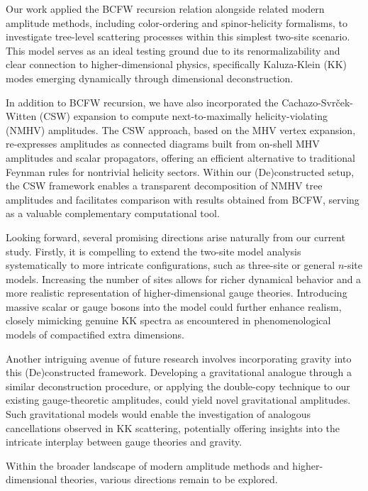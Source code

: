 \documentclass[12pt]{article}
\numberwithin{equation}{section}
\begin{document}
Our work applied the BCFW recursion relation alongside related modern amplitude methods, including color-ordering and spinor-helicity formalisms, to investigate tree-level scattering processes within this simplest two-site scenario. This model serves as an ideal testing ground due to its renormalizability and clear connection to higher-dimensional physics, specifically Kaluza-Klein (KK) modes emerging dynamically through dimensional deconstruction.

In addition to BCFW recursion, we have also incorporated the Cachazo-Svrček-Witten (CSW) expansion to compute next-to-maximally helicity-violating (NMHV) amplitudes. The CSW approach, based on the MHV vertex expansion, re-expresses amplitudes as connected diagrams built from on-shell MHV amplitudes and scalar propagators, offering an efficient alternative to traditional Feynman rules for nontrivial helicity sectors. Within our (De)constructed setup, the CSW framework enables a transparent decomposition of NMHV tree amplitudes and facilitates comparison with results obtained from BCFW, serving as a valuable complementary computational tool.

Looking forward, several promising directions arise naturally from our current study. Firstly, it is compelling to extend the two-site model analysis systematically to more intricate configurations, such as three-site or general \( n \)-site models. Increasing the number of sites allows for richer dynamical behavior and a more realistic representation of higher-dimensional gauge theories. Introducing massive scalar or gauge bosons into the model could further enhance realism, closely mimicking genuine KK spectra as encountered in phenomenological models of compactified extra dimensions.

Another intriguing avenue of future research involves incorporating gravity into this (De)constructed framework. Developing a gravitational analogue through a similar deconstruction procedure, or applying the double-copy technique to our existing gauge-theoretic amplitudes, could yield novel gravitational amplitudes. Such gravitational models would enable the investigation of analogous cancellations observed in KK scattering, potentially offering insights into the intricate interplay between gauge theories and gravity.

Within the broader landscape of modern amplitude methods and higher-dimensional theories, various directions remain to be explored.
\end{document}
